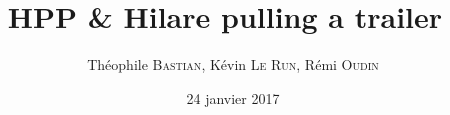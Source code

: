 \documentclass[11pt]{beamer}
\author{Théophile \textsc{Bastian}, Kévin \textsc{Le Run}, Rémi \textsc{Oudin}}
\title{HPP \& \og{}Hilare pulling a trailer~\fg}
\date{24 janvier 2017}
\begin{document}
\begin{frame}
	\titlepage{}
	\tableofcontents
\end{frame}

\end{document}
